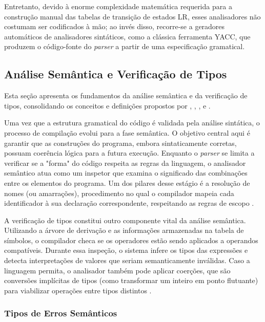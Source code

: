 Entretanto, devido à enorme complexidade matemática requerida para a construção manual das tabelas de transição de estados LR, esses analisadores não costumam ser codificados à mão; ao invés disso, recorre-se a geradores automáticos de analisadores sintáticos, como a clássica ferramenta YACC, que produzem o código-fonte do \textit{parser} a partir de uma especificação gramatical.

\subsection{Análise Semântica e Verificação de Tipos}

Esta seção apresenta os fundamentos da análise semântica e da verificação de tipos, consolidando os conceitos e definições propostos por , , ,  e .

Uma vez que a estrutura gramatical do código é validada pela análise sintática, o processo de compilação evolui para a fase semântica. O objetivo central aqui é garantir que as construções do programa, embora sintaticamente corretas, possuam coerência lógica para a futura execução. Enquanto o \textit{parser} se limita a verificar se a "forma" do código respeita as regras da linguagem, o analisador semântico atua como um inspetor que examina o significado das combinações entre os elementos do programa. Um dos pilares desse estágio é a resolução de nomes (ou amarrações), procedimento no qual o compilador mapeia cada identificador à sua declaração correspondente, respeitando as regras de escopo \cite{aho1995,cooper2012,sebesta2018}.

A verificação de tipos constitui outro componente vital da análise semântica. Utilizando a árvore de derivação e as informações armazenadas na tabela de símbolos, o compilador checa se os operadores estão sendo aplicados a operandos compatíveis. Durante essa inspeção, o sistema infere os tipos das expressões e detecta interpretações de valores que seriam semanticamente inválidas. Caso a linguagem permita, o analisador também pode aplicar coerções, que são conversões implícitas de tipos (como transformar um inteiro em ponto flutuante) para viabilizar operações entre tipos distintos \cite{price2001,nystrom2021,sebesta2018}.

\subsubsection*{Tipos de Erros Semânticos}

